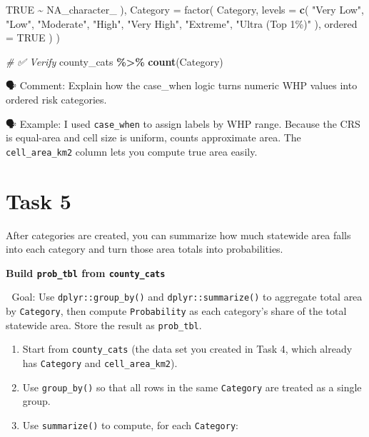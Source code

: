 \documentclass[
  12pt,
]{scrreprt}
\newenvironment{Shaded}{\begin{snugshade}}{\end{snugshade}}
\newcommand{\AttributeTok}[1]{\textcolor[rgb]{0.13,0.29,0.53}{#1}}
\newcommand{\CommentTok}[1]{\textcolor[rgb]{0.56,0.35,0.01}{\textit{#1}}}
\newcommand{\ConstantTok}[1]{\textcolor[rgb]{0.56,0.35,0.01}{#1}}
\newcommand{\FunctionTok}[1]{\textcolor[rgb]{0.13,0.29,0.53}{\textbf{#1}}}
\newcommand{\NormalTok}[1]{#1}
\newcommand{\SpecialCharTok}[1]{\textcolor[rgb]{0.81,0.36,0.00}{\textbf{#1}}}
\newcommand{\StringTok}[1]{\textcolor[rgb]{0.31,0.60,0.02}{#1}}
\begin{document}
\begin{Shaded}
\begin{Highlighting}[]
      \ConstantTok{TRUE} \SpecialCharTok{\textasciitilde{}} \StringTok{\textasciigrave{}}\AttributeTok{NA\_character\_}\StringTok{\textasciigrave{}}
\NormalTok{    ),}
    \AttributeTok{Category =} \StringTok{\textasciigrave{}}\AttributeTok{factor}\StringTok{\textasciigrave{}}\NormalTok{(}
\NormalTok{      Category,}
      \AttributeTok{levels =} \FunctionTok{c}\NormalTok{(}
        \StringTok{"Very Low"}\NormalTok{,}
        \StringTok{"Low"}\NormalTok{,}
        \StringTok{"Moderate"}\NormalTok{,}
        \StringTok{"High"}\NormalTok{,}
        \StringTok{"Very High"}\NormalTok{,}
        \StringTok{"Extreme"}\NormalTok{,}
        \StringTok{"Ultra (Top 1\%)"}
\NormalTok{      ),}
      \AttributeTok{ordered =} \StringTok{\textasciigrave{}}\AttributeTok{TRUE}\StringTok{\textasciigrave{}}
\NormalTok{    )}
\NormalTok{  )}
\end{Highlighting}
\end{Shaded}

\begin{Shaded}
\begin{Highlighting}[]
\CommentTok{\# ✅  Verify}
\NormalTok{county\_cats }\SpecialCharTok{\%\textgreater{}\%} \FunctionTok{count}\NormalTok{(Category)}
\end{Highlighting}
\end{Shaded}

🗣 Comment: Explain how the case\_when logic turns numeric WHP values into ordered risk categories.

🗣 Example: I used \texttt{case\_when} to assign labels by WHP range. Because the CRS is equal-area and cell size is uniform, counts approximate area. The \texttt{cell\_area\_km2} column lets you compute true area easily.

\section{Task 5}\label{task-5}

After categories are created, you can summarize how much statewide area falls into each category and turn those area totals into probabilities.

\textbf{Build \texttt{prob\_tbl} from \texttt{county\_cats}}

🎯 Goal: Use \texttt{dplyr::group\_by()} and \texttt{dplyr::summarize()} to aggregate total area by \texttt{Category}, then compute \texttt{Probability} as each category's share of the total statewide area. Store the result as \texttt{prob\_tbl}.

\begin{enumerate}
\def\labelenumi{\arabic{enumi}.}
\item
  Start from \texttt{county\_cats} (the data set you created in Task 4, which already has \texttt{Category} and \texttt{cell\_area\_km2}).
\item
  Use \texttt{group\_by()} so that all rows in the same \texttt{Category} are treated as a single group.
\item
  Use \texttt{summarize()} to compute, for each \texttt{Category}:
\end{enumerate}
\end{document}
